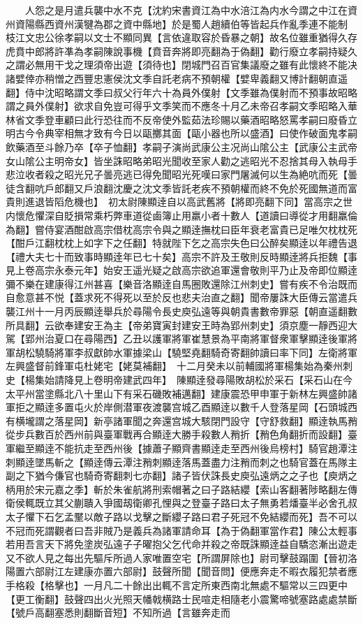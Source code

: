 　　人怨之是月遣兵襲中水不克【沈約宋書資江為中水涪江為内水今謂之中江在資州資陽縣西資州漢犍為郡之資中縣地】於是蜀人趙續伯等皆起兵作亂季連不能制　枝江文忠公徐孝嗣以文士不顯同異【言依違取容於昏暴之朝】故名位雖重猶得久存虎賁中郎將許凖為孝嗣陳說事機【賁音奔將即亮翻為于偽翻】勸行廢立孝嗣持疑久之謂必無用干戈之理須帝出遊【須待也】閉城門召百官集議廢之雖有此懷終不能决諸嬖倖亦稍憎之西豐忠憲侯沈文季自託老病不預朝權【嬖卑義翻又博計翻朝直遥翻】侍中沈昭略謂文季曰叔父行年六十為員外僕射【文季雖為僕射而不預事故昭略謂之員外僕射】欲求自免豈可得乎文季笑而不應冬十月乙未帝召孝嗣文季昭略入華林省文季登車顧曰此行恐往而不反帝使外監茹法珍賜以藥酒昭略怒罵孝嗣曰廢昏立明古今令典宰相無才致有今日以甌擲其面【甌小器也所以盛酒】曰使作破面鬼孝嗣飲藥酒至斗餘乃卒【卒子恤翻】孝嗣子演尚武康公主况尚山隂公主【武康公主武帝女山隂公主明帝女】皆坐誅昭略弟昭光聞收至家人勸之逃昭光不忍捨其母入執母手悲泣收者殺之昭光兄子曇亮逃已得免聞昭光死嘆曰家門屠滅何以生為絶吭而死【曇徒含翻吭戶郎翻又戶浪翻沈慶之沈文季皆託老疾不預朝權而終不免於死國無道而富貴則進退皆䧟危機也】　初太尉陳顯逹自以高武舊將【將即亮翻下同】當高宗之世内懷危懼深自貶損常乘朽弊車道從鹵簿止用羸小者十數人【道讀曰導從才用翻羸倫為翻】嘗侍宴酒酣啟高宗借枕高宗令與之顯逹撫枕曰臣年衰老富貴已足唯欠枕枕死【酣戶江翻枕枕上如字下之任翻】特就陛下乞之高宗失色曰公醉矣顯逹以年禮告退【禮大夫七十而致事時顯逹年已七十矣】高宗不許及王敬則反時顯逹將兵拒魏【事見上卷高宗永泰元年】始安王遥光疑之啟高宗欲追軍還會敬則平乃止及帝即位顯逹彌不樂在建康得江州甚喜【樂音洛顯逹自馬圈敗還除江州刺史】嘗有疾不令治既而自愈意甚不悦【蓋求死不得死以至於反也悲夫治直之翻】聞帝屢誅大臣傳云當遣兵襲江州十一月丙辰顯逹舉兵於尋陽令長史庾弘遠等與朝貴書數帝罪惡【朝直遥翻數所具翻】云欲奉建安王為主【帝弟寶寅封建安王時為郢州刺史】須京塵一靜西迎大駕【郢州治夏口在尋陽西】乙丑以護軍將軍崔慧景為平南將軍督衆軍擊顯逹後軍將軍胡松驍騎將軍李叔獻帥水軍據梁山【驍堅堯翻騎奇寄翻帥讀曰率下同】左衛將軍左興盛督前鋒軍屯杜姥宅【姥莫補翻】　十二月癸未以前輔國將軍楊集始為秦州刺史【楊集始請降見上卷明帝建武四年】　陳顯逹發尋陽敗胡松於采石【采石山在今太平州當塗縣北八十里山下有采石磯敗補邁翻】建康震恐甲申軍于新林左興盛帥諸軍拒之顯逹多置屯火於岸側潜軍夜渡襲宫城乙酉顯逹以數千人登落星岡【石頭城西有横壠謂之落星岡】新亭諸軍聞之奔還宫城大駭閉門設守【守舒救翻】顯逹執馬矟從步兵數百於西州前與臺軍戰再合顯逹大勝手殺數人矟折【矟色角翻折而設翻】臺軍繼至顯逹不能抗走至西州後【據蕭子顯齊書顯逹走至西州後烏榜村】騎官趙潭注刺顯逹墜馬斬之【顯逹傳云潭注矟刺顯逹落馬蓋盡力注矟而刺之也騎官蓋在馬隊主副之下猶今傔官也騎奇寄翻刺七亦翻】諸子皆伏誅長史庾弘遠炳之之子也【庾炳之柄用於宋元嘉之季】斬於朱雀航將刑索帽著之曰子路結纓【索山客翻著陟略翻左傳衛侯輒既立其父蒯聵入爭國刼衛卿孔悝與之登臺子路曰太子無勇若燔臺半必舍孔叔太子懼下石乞孟黶以敵子路以戈擊之斷纓子路曰君子死冠不免結纓而死】吾不可以不冠而死謂觀者曰吾非賊乃是義兵為諸軍請命耳【為于偽翻軍當作君】陳公太輕事若用吾言天下將免塗炭弘遠子子曜抱父乞代命并殺之帝既誅顯逹益自驕恣漸出遊走又不欲人見之每出先驅斥所過人家唯置空宅【所謂屏除也】尉司擊鼓蹋圍【晉初洛陽置六部尉江左建康亦置六部尉】鼓聲所聞【聞音問】便應奔走不暇衣履犯禁者應手格殺【格擊也】一月凡二十餘出出輒不言定所東西南北無處不驅常以三四更中【更工衡翻】鼓聲四出火光照天幡戟横路士民喧走相隨老小震驚啼號塞路處處禁斷【號戶高翻塞悉則翻斷音短】不知所過【言雖奔走而